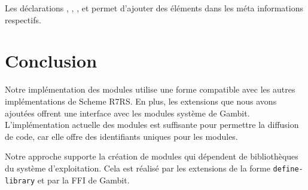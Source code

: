 Les déclarations , , ,
 et  permet d'ajouter des éléments dans les
méta informations respectifs.

\section{Conclusion}

Notre implémentation des modules utilise une forme compatible avec
les autres implémentations de Scheme R7RS. En plus, les extensions que nous avons ajoutées
offrent une interface avec les modules système de Gambit. L'implémentation actuelle des modules
est suffisante pour permettre la diffusion de code, car elle offre des identifiants uniques pour
les modules.

Notre approche supporte la création de modules qui dépendent de bibliothèques
du système d'exploitation.  Cela est réalisé par les extensions de la forme
\texttt{define-library} et par la FFI de Gambit.

